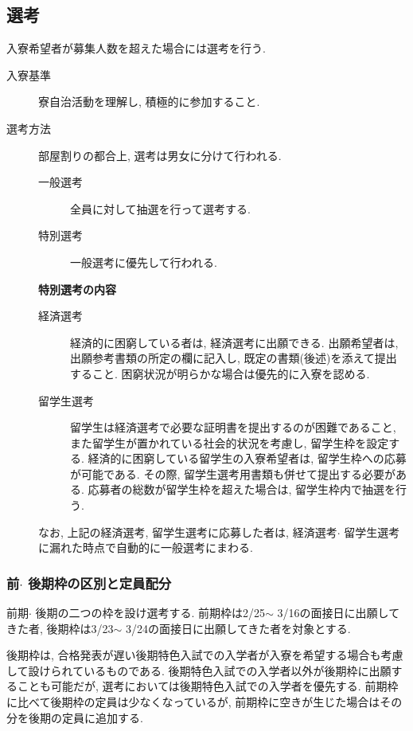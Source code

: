 \documentclass[10pt,b5jsbook,dvips,dvipdfmx,openany]{jsbook}
\theoremstyle{definition}
\begin{document}
		\subsection{選考}
		入寮希望者が募集人数を超えた場合には選考を行う.
		\begin{description}
		\item[入寮基準]
		寮自治活動を理解し, 積極的に参加すること.
		\item[選考方法]
		部屋割りの都合上, 選考は男女に分けて行われる.
			\begin{description}
			\item[一般選考]全員に対して抽選を行って選考する.
			\item[特別選考] 一般選考に優先して行われる.
	\end{description}
	\begin{itembox}[l]{\bf 特別選考の内容}

		\begin{description}
		\item[経済選考] 経済的に困窮している者は, 経済選考に出願できる. 出願希望者は, 出願参考書類の所定の欄に記入し, 既定の書類(後述)を添えて提出すること. 困窮状況が明らかな場合は優先的に入寮を認める.
		\item[留学生選考] 留学生は経済選考で必要な証明書を提出するのが困難であること, また留学生が置かれている社会的状況を考慮し, 留学生枠を設定する. 経済的に困窮している留学生の入寮希望者は, 留学生枠への応募が可能である. その際, 留学生選考用書類も併せて提出する必要がある. 応募者の総数が留学生枠を超えた場合は, 留学生枠内で抽選を行う.
		\end{description}

なお, 上記の経済選考, 留学生選考に応募した者は, 経済選考$ \cdot $ 留学生選考に漏れた時点で自動的に一般選考にまわる.

	\end{itembox}

	\end{description}

			\subsubsection{前$ \cdot $ 後期枠の区別と定員配分}
			前期$ \cdot $ 後期の二つの枠を設け選考する. 前期枠は2/25$ \sim $ 3/16の面接日に出願してきた者, 後期枠は3/23$ \sim $ 3/24の面接日に出願してきた者を対象とする.

			後期枠は, 合格発表が遅い後期特色入試での入学者が入寮を希望する場合も考慮して設けられているものである. 後期特色入試での入学者以外が後期枠に出願することも可能だが, 選考においては後期特色入試での入学者を優先する. 前期枠に比べて後期枠の定員は少なくなっているが, 前期枠に空きが生じた場合はその分を後期の定員に追加する.
\end{document}

